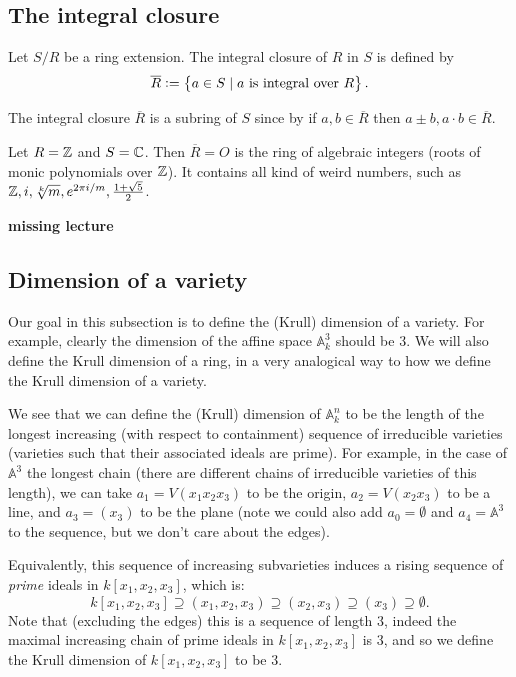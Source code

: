 \documentclass[11pt,a4paper]{article}
\newcommand{\A}{\mathbb A}
\begin{document}
\subsection{The integral closure}
\begin{definition}
  Let $S/R$ be a ring extension.
  The integral closure of $R$ in $S$ is defined by
  \[
    \overline R :=
    \left\{a \in S \mid \text{$a$ is integral over $R$}\right\}.
  \]
\end{definition}

\begin{corollary}
  The integral closure $\overline R$ is a subring of $S$
  since by 
  if $a,b \in \overline R$
  then $a\pm b, a\cdot b \in \overline R$.
\end{corollary}

\begin{example}
  Let $R = \mathbb{Z}$ and $S = \mathbb{C}$.
  Then $\overline R = O$ is the ring of algebraic
  integers (roots of monic polynomials over $\mathbb{Z}$).
  It contains all kind of weird numbers,
  such as $\mathbb{Z},i,\sqrt[k]{m},e^{2\pi i/m},\frac{1+\sqrt{5}}{2}$.
\end{example}



\textbf{missing lecture}

\subsection{Dimension of a variety}
Our goal in this subsection is to define the (Krull) dimension of a variety.
For example, clearly the dimension of the affine space $\A_k^3$ should
be $3$.
We will also define the Krull dimension of a ring,
in a very analogical way to how we define the Krull dimension
of a variety.

\begin{remark}
  We see that we can define the (Krull) dimension of $\A_k^n$ to be
  the length of the longest increasing (with respect to containment) sequence
  of irreducible varieties (varieties such that their associated ideals
  are prime).
  For example, in the case of $\A^3$ the longest chain (there are
  different chains of irreducible varieties of this length),
  we can take $a_1 = V(x_1 x_2 x_3)$ to be the origin,
  $a_2 = V(x_2 x_3)$ to be a line, and $a_3 = (x_3)$ to be the plane
  (note we could also add $a_0 = \emptyset$ and $a_4 = \A^3$ to the sequence,
  but we don't care about the edges).

  Equivalently, this sequence of increasing subvarieties induces a rising
  sequence of \textit{prime} ideals in $k[x_1,x_2,x_3]$,
  which is:
  \[
    k[x_1,x_2,x_3] \supseteq
    (x_1,x_2,x_3) \supseteq
    (x_2,x_3) \supseteq
    (x_3) \supseteq
    \emptyset.
  \]
  Note that (excluding the edges) this is a sequence of length $3$,
  indeed the maximal increasing chain of prime ideals in $k[x_1,x_2,x_3]$
  is $3$, and so we define the Krull dimension of $k[x_1,x_2,x_3]$
  to be $3$.
\end{remark}
\end{document}
